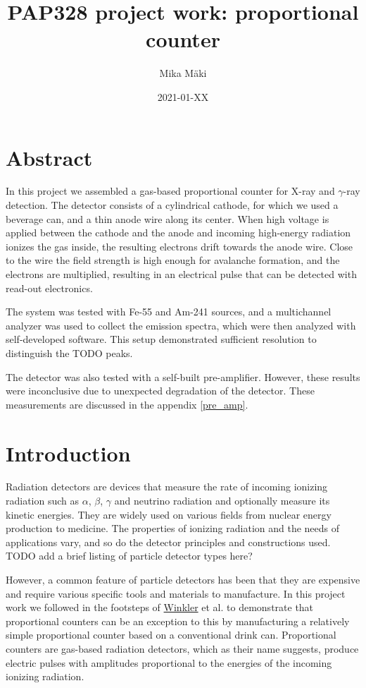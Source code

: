 \documentclass[a4paper]{article}
\title{PAP328 project work: proportional counter}
\author{Mika Mäki}
\date{2021-01-XX}
\begin{document}
\maketitle

\section*{Abstract}
In this project we assembled a gas-based proportional counter for X-ray and $\gamma$-ray detection.
The detector consists of a cylindrical cathode, for which we used a beverage can, and a thin anode wire along its center.
When high voltage is applied between the cathode and the anode and incoming high-energy radiation ionizes the gas inside, the resulting electrons drift towards the anode wire.
Close to the wire the field strength is high enough for avalanche formation, and the electrons are multiplied, resulting in an electrical pulse that can be detected with read-out electronics.

The system was tested with Fe-55 and Am-241 sources, and a multichannel analyzer was used to collect the emission spectra, which were then analyzed with self-developed software.
This setup demonstrated sufficient resolution to distinguish the TODO peaks.


The detector was also tested with a self-built pre-amplifier.
However, these results were inconclusive due to unexpected degradation of the detector.
These measurements are discussed in the appendix \ref{pre_amp}.

\tableofcontents


\section{Introduction}
\label{introduction}
Radiation detectors are devices that measure the rate of incoming ionizing radiation such as $\alpha$, $\beta$, $\gamma$ and neutrino radiation and optionally measure its kinetic energies.
They are widely used on various fields from nuclear energy production to medicine.
The properties of ionizing radiation and the needs of applications vary, and so do the detector principles and constructions used.
TODO add a brief listing of particle detector types here?

However, a common feature of particle detectors has been that they are expensive and require various specific tools and materials to manufacture.
In this project work we followed in the footsteps of
\href{https://www.helsinki.fi/en/people/people-finder/alexander-winkler-9110087}{Winkler}
et al. \cite{winkler_gaseous_2015} to demonstrate that proportional counters can be an exception to this by manufacturing a relatively simple proportional counter based on a conventional drink can.
Proportional counters are gas-based radiation detectors, which as their name suggests, produce electric pulses with amplitudes proportional to the energies of the incoming ionizing radiation.
\end{document}
